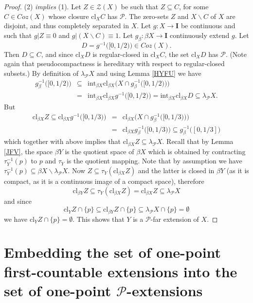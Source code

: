 \documentclass{amsart}
\theoremstyle{definition}
\theoremstyle{remark}
\theoremstyle{notation}
\numberwithin{equation}{section}
\begin{document}
\begin{proof}
(2) {\em  implies} (1).   Let $Z\in {\mathscr Z}(X)$ be such that $Z\subseteq C$, for some $C\in Coz(X)$ whose closure
$\mbox{cl}_X C$ has ${\mathcal P}$. The zero-sets $Z$ and $X\backslash C$ of $X$ are  disjoint, and thus completely separated in $X$. Let
$g:X\rightarrow\mathbf{I}$ be continuous and such that $g|Z \equiv 0$ and  $g|(X\backslash C)\equiv 1$. Let
$g_\beta:\beta X\rightarrow\mathbf{I}$  continuously  extend $g$. Let
\[D=g^{-1}\big([0,1/2)\big)\in Coz(X).\]
Then $D\subseteq C$,
and  since  $\mbox{cl}_X D$ is regular-closed in $\mbox{cl}_X C$, the set $\mbox{cl}_X D$ has  $\mathcal{P}$.
(Note again that pseudocompactness is hereditary with respect to regular-closed subsets.)  By definition of $\lambda_{{\mathcal P}} X$ and using Lemma \ref{HYFU} we have
\begin{eqnarray*}
g_\beta^{-1}\big([0,1/2)\big)&\subseteq&\mbox{int}_{\beta X}\mbox{cl}_{\beta X}\big(X\cap g_\beta^{-1}\big([0,1/2)\big)\big)\\&=&\mbox{int}_{\beta X}\mbox{cl}_{\beta X}g^{-1}\big([0,1/2)\big)=\mbox{int}_{\beta X}\mbox{cl}_{\beta X}D\subseteq\lambda_{{\mathcal P}} X.
\end{eqnarray*}
But
\begin{eqnarray*}
\mbox{cl}_{\beta X}Z\subseteq \mbox{cl}_{\beta X}g^{-1}\big([0,1/3)\big)&=&\mbox{cl}_{\beta X}\big(X\cap g_\beta^{-1}\big([0,1/3)\big)\big)\\&=&\mbox{cl}_{\beta X}g_\beta^{-1}\big([0,1/3)\big)\subseteq g_\beta^{-1}\big([0,1/3]\big)
\end{eqnarray*}
which together with above implies that $\mbox{cl}_{\beta X}Z\subseteq\lambda_{{\mathcal P}} X$.
Recall that by Lemma \ref{JFV}, the space $\beta Y$ is the quotient space of $\beta X$ which is obtained by contracting  $\tau_Y^{-1}(p)$ to $p$ and $\tau_Y$ is the quotient
mapping. Note that by assumption we have $\tau_Y^{-1} (p)\subseteq \beta X\backslash\lambda_{{\mathcal P}} X$. Now $Z\subseteq\tau_Y (\mbox{cl}_{\beta X} Z)$ and the latter is closed in $\beta Y$ (as it is compact, as it is a continuous image of a compact space), therefore
\[\mbox{cl}_{\beta Y} Z \subseteq\tau_Y(\mbox{cl}_{\beta X} Z)=\mbox{cl}_{\beta X} Z\subseteq\lambda_{{\mathcal P}} X\]
and  since
\[\mbox{cl}_Y Z\cap \{p\}\subseteq\mbox{cl}_{\beta Y} Z\cap \{p\}\subseteq\lambda_{{\mathcal P}} X\cap \{p\}=\emptyset\]
we have $\mbox{cl}_Y Z\cap \{p\}=\emptyset$. This shows that  $Y$ is a ${\mathcal P}$-far extension of $X$.
\end{proof}

\section{Embedding the set of  one-point first-countable  extensions into the set of one-point ${\mathcal P}$-extensions}
\end{document}
